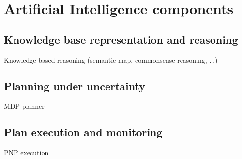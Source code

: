 \section{Artificial Intelligence components}

\subsection{Knowledge base representation and reasoning}

Knowledge based reasoning (semantic map, commonsense reasoning, ...)

\subsection{Planning under uncertainty}

MDP planner

\subsection{Plan execution and monitoring}

PNP execution

